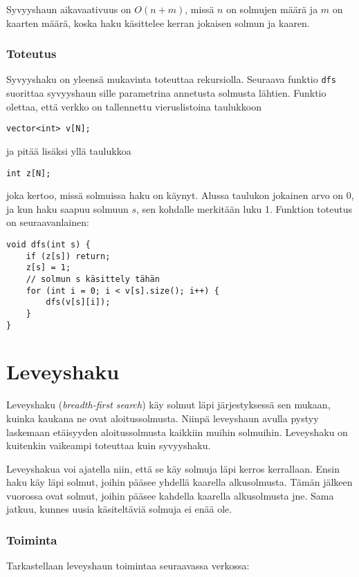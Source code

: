 Syvyyshaun aikavaativuus on $O(n+m)$,
missä $n$ on solmujen määrä ja $m$ on kaarten määrä,
koska haku käsittelee kerran jokaisen solmun ja kaaren.

\subsubsection*{Toteutus}

Syvyyshaku on yleensä mukavinta toteuttaa
rekursiolla.
Seuraava funktio \texttt{dfs}
suorittaa syvyyshaun sille parametrina
annetusta solmusta lähtien.
Funktio olettaa, että
verkko on tallennettu vieruslistoina
taulukkoon
\begin{lstlisting}
vector<int> v[N];
\end{lstlisting}
ja pitää lisäksi yllä taulukkoa
\begin{lstlisting}
int z[N];
\end{lstlisting}
joka kertoo, missä solmuissa haku on käynyt.
Alussa taulukon jokainen arvo on 0,
ja kun haku saapuu solmuun $s$,
sen kohdalle merkitään luku 1.
Funktion toteutus on seuraavanlainen:
\begin{lstlisting}
void dfs(int s) {
    if (z[s]) return;
    z[s] = 1;
    // solmun s käsittely tähän
    for (int i = 0; i < v[s].size(); i++) {
        dfs(v[s][i]);
    }
}
\end{lstlisting}

\section{Leveyshaku}

Leveyshaku (\textit{breadth-first search})
käy solmut läpi järjestyksessä sen mukaan,
kuinka kaukana ne ovat aloitussolmusta.
Niinpä leveyshaun avulla pystyy laskemaan
etäisyyden aloitussolmusta kaikkiin
muihin solmuihin.
Leveyshaku on kuitenkin vaikeampi
toteuttaa kuin syvyyshaku.

Leveyshakua voi ajatella niin,
että se käy solmuja läpi kerros kerrallaan.
Ensin haku käy läpi solmut,
joihin pääsee yhdellä kaarella
alkusolmusta.
Tämän jälkeen vuorossa ovat
solmut, joihin pääsee kahdella
kaarella alkusolmusta jne.
Sama jatkuu, kunnes uusia käsiteltäviä
solmuja ei enää ole.

\subsubsection*{Toiminta}

Tarkastellaan leveyshaun toimintaa
seuraavassa verkossa:

